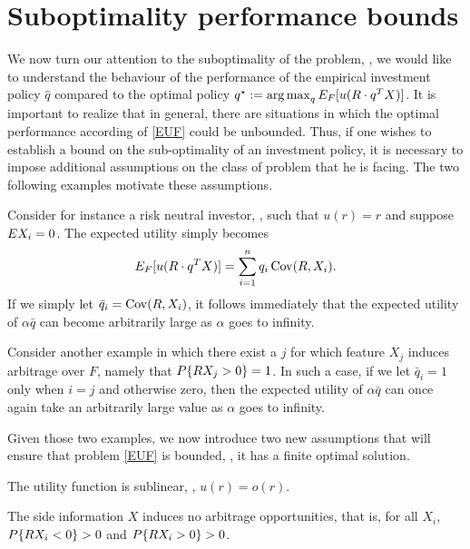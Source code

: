 \section{Suboptimality performance bounds}\label{sec:sub}

We now turn our attention to the suboptimality of the problem, \ie, we would like to
understand the behaviour of the performance of the empirical investment policy $\hat q$
compared to the optimal policy $q^\star := \operatorname*{arg\,max}_q E_F[u(R\cdot q^T X)]$. It is
important to realize that in general, there are situations in which the optimal
performance according of \eqref{EUF} could be unbounded. Thus, if one wishes to establish
a bound on the sub-optimality of an investment policy, it is necessary to impose
additional assumptions on the class of problem that he is facing. The two following
examples motivate these assumptions.

\begin{ex}
  Consider for instance a risk neutral investor, \ie, such that $u(r)=r$ and suppose
  $E X_i=0$. The expected utility simply becomes
  \[
    E_F[u(R\cdot q^T X)] = \sum_{i=1}^{n}q_i\operatorname{Cov}(R,X_i).
  \]
  If we simply let $\bar q_i = \operatorname{Cov}(R,X_i)$, it follows immediately that the expected
  utility of $\alpha \bar q$ can become arbitrarily large as $\alpha$ goes to infinity.
\end{ex}

\begin{ex}
  Consider another example in which there exist a $j$ for which feature $X_j$ induces
  arbitrage over $F$, namely that $P\{RX_j>0\} = 1$. In such a case, if we let
  $\bar q_i = 1$ only when $i=j$ and otherwise zero, then the expected utility of
  $\alpha\bar q$ can once again take an arbitrarily large value as $\alpha$ goes to
  infinity.
\end{ex}

Given those two examples, we now introduce two new assumptions that will ensure that
problem \eqref{EUF} is bounded, \ie, it has a finite optimal solution.

\begin{assumption}\label{ass:usublinear}
  The utility function is sublinear, \ie, $u(r) = o(r)$. 
\end{assumption}

\begin{assumption}\label{ass:arbitrage}
  The side information $X$ induces no arbitrage opportunities, that is, for all $X_i$,
  $P\{RX_i < 0\} > 0$ and $P\{RX_i > 0\} > 0$.
\end{assumption}

